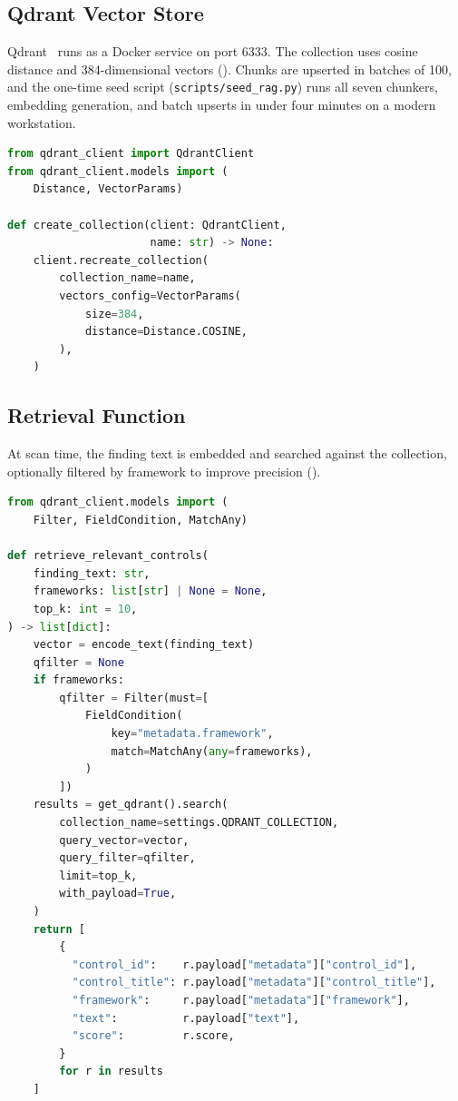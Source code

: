 \documentclass[conference]{IEEEtran}
\begin{document}
\subsection{Qdrant Vector Store}
Qdrant~\cite{qdrant} runs as a Docker service on port 6333. The collection uses
cosine distance and 384-dimensional vectors (). Chunks are
upserted in batches of 100, and the one-time seed script
(\texttt{scripts/seed\_rag.py}) runs all seven chunkers, embedding generation,
and batch upserts in under four minutes on a modern workstation.

\begin{lstlisting}[language=Python, label={lst:qdrant},
  caption={Qdrant collection initialization.}]
from qdrant_client import QdrantClient
from qdrant_client.models import (
    Distance, VectorParams)

def create_collection(client: QdrantClient,
                      name: str) -> None:
    client.recreate_collection(
        collection_name=name,
        vectors_config=VectorParams(
            size=384,
            distance=Distance.COSINE,
        ),
    )
\end{lstlisting}

\subsection{Retrieval Function}
At scan time, the finding text is embedded and searched against the collection,
optionally filtered by framework to improve precision ().

\begin{lstlisting}[language=Python, label={lst:retrieve},
  caption={Core retrieval function with optional framework filter.}]
from qdrant_client.models import (
    Filter, FieldCondition, MatchAny)

def retrieve_relevant_controls(
    finding_text: str,
    frameworks: list[str] | None = None,
    top_k: int = 10,
) -> list[dict]:
    vector = encode_text(finding_text)
    qfilter = None
    if frameworks:
        qfilter = Filter(must=[
            FieldCondition(
                key="metadata.framework",
                match=MatchAny(any=frameworks),
            )
        ])
    results = get_qdrant().search(
        collection_name=settings.QDRANT_COLLECTION,
        query_vector=vector,
        query_filter=qfilter,
        limit=top_k,
        with_payload=True,
    )
    return [
        {
          "control_id":    r.payload["metadata"]["control_id"],
          "control_title": r.payload["metadata"]["control_title"],
          "framework":     r.payload["metadata"]["framework"],
          "text":          r.payload["text"],
          "score":         r.score,
        }
        for r in results
    ]
\end{lstlisting}
\end{document}
